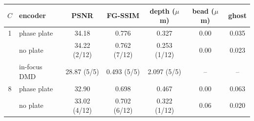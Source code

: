 \begin{tabular}{@{}cl ccc cc@{}}\toprule
$C$ & encoder & PSNR & FG-SSIM & depth ($\mu$m) & bead ($\mu$m) & ghost\\\midrule
1 & phase plate & 34.18 & 0.776 & 0.327 & 0.00 & 0.035\\
 & no plate & 34.22 (2/12) & 0.762 (7/12) & 0.253 (1/12) & 0.00 & 0.023\\
 & in-focus DMD & 28.87 (5/5) & 0.493 (5/5) & 2.097 (5/5) & -- & --\\
\midrule
8 & phase plate & 32.90 & 0.698 & 0.467 & 0.00 & 0.063\\
 & no plate & 33.02 (4/12) & 0.702 (6/12) & 0.322 (1/12) & 0.06 & 0.020\\
\bottomrule\end{tabular}
